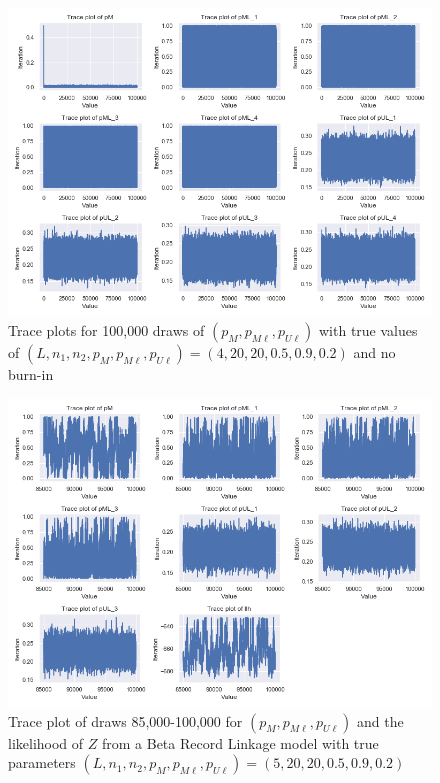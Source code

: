 \documentclass[11pt,reqno]{amsart}
\newcommand\params{(p_M, p_{M\ell}, p_{U\ell})}
\newcommand\longparam{(L,n_1,n_2, p_M,p_{M\ell},p_{U\ell})}
\begin{document}
\begin{figure}[htbp]
\begin{center}
\includegraphics[width=\textwidth]{../Figures/mm/nM10/allTrace_nM10_L4.png}
\caption{Trace plots for 100,000 draws of $\params$ with true values of $\longparam = (4,20,20,0.5,0.9,0.2)$ and no burn-in}
\label{mmConverge}
\end{center}
\end{figure}

\begin{figure}[htbp]
\begin{center}
\includegraphics[width=\textwidth]{../Figures/bpm/nM10/allTrace_nM10_L3.png}
\caption{Trace plot of draws 85,000-100,000 for $\params$ and the likelihood of $Z$ from a Beta Record Linkage model with true parameters $(L, n_1, n_2, p_M, p_{M\ell}, p_{U\ell}) = (5, 20, 20, 0.5, 0.9, 0.2)$ }
\label{bpmTrace}
\end{center}
\end{figure}
\end{document}
